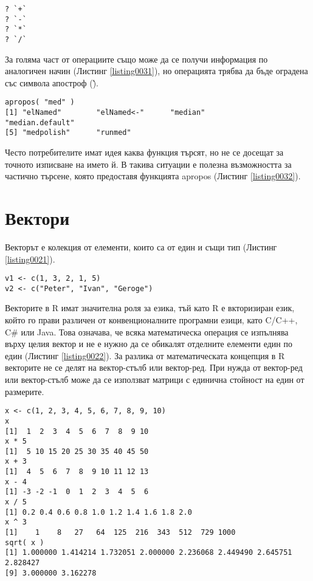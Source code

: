 \begin{lstlisting}[caption=Документация за операции, label=listing0031]
? `+`
? `-`
? `*`
? `/`
\end{lstlisting}

За голяма част от операциите също може да се получи информация по аналогичен начин (Листинг \ref{listing0031}), но операцията трябва да бъде оградена със символа апостроф (\`).

\begin{lstlisting}[caption=Частично търсене, label=listing0032]
apropos( "med" )
[1] "elNamed"        "elNamed<-"      "median"         "median.default"
[5] "medpolish"      "runmed"
\end{lstlisting}

Често потребителите имат идея каква функция търсят, но не се досещат за точното изписване на името й. В такива ситуации е полезна възможността за частично търсене, която предоставя функцията apropos (Листинг \ref{listing0032}).

\section{Вектори}

Векторът е колекция от елементи, които са от един и същи тип (Листинг \ref{listing0021}). 

\begin{lstlisting}[caption=Вектори от числа и символни низове, label=listing0021]
v1 <- c(1, 3, 2, 1, 5)
v2 <- c("Peter", "Ivan", "Geroge")
\end{lstlisting}

Векторите в R имат значителна роля за езика, тъй като R е вкторизиран език, който го прави различен от конвенционалните програмни езици, като C/C++, C\# или Java. Това означава, че всяка математическа операция се изпълнява върху целия вектор и не е нужно да се обикалят отделните елементи един по един (Листинг \ref{listing0022}). За разлика от математическата концепция в R векторите не се делят на вектор-стълб или вектор-ред. При нужда от вектор-ред или вектор-стълб може да се използват матрици с единична стойност на един от размерите. 

\begin{lstlisting}[caption=Базови операции над вектори, label=listing0022]
x <- c(1, 2, 3, 4, 5, 6, 7, 8, 9, 10)
x
[1]  1  2  3  4  5  6  7  8  9 10
x * 5
[1]  5 10 15 20 25 30 35 40 45 50
x + 3
[1]  4  5  6  7  8  9 10 11 12 13
x - 4
[1] -3 -2 -1  0  1  2  3  4  5  6
x / 5
[1] 0.2 0.4 0.6 0.8 1.0 1.2 1.4 1.6 1.8 2.0
x ^ 3
[1]    1    8   27   64  125  216  343  512  729 1000
sqrt( x )
[1] 1.000000 1.414214 1.732051 2.000000 2.236068 2.449490 2.645751 2.828427
[9] 3.000000 3.162278
\end{lstlisting}

